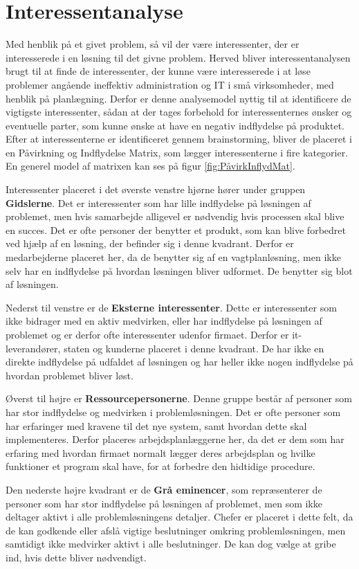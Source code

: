 \section{Interessentanalyse}
Med henblik på et givet problem, så vil der være interessenter, der er interesserede i en løsning til det givne problem. Herved bliver interessentanalysen brugt til at finde de interessenter, der kunne være interesserede i at løse problemer angående ineffektiv administration og IT i små virksomheder, med henblik på planlægning.
Derfor er denne analysemodel nyttig til at identificere de vigtigste interessenter, sådan at der tages forbehold for interessenternes ønsker og eventuelle parter, som kunne ønske at have en negativ indflydelse på produktet. Efter at interessenterne er identificeret gennem brainstorming, bliver de placeret i en Påvirkning og Indflydelse Matrix, som lægger interessenterne i fire kategorier. En generel model af matrixen kan ses på figur \ref{fig:PåvirkInflydMat}.

Interessenter placeret i det øverste venstre hjørne hører under gruppen \textbf{Gidslerne}. Det er interessenter som har lille indflydelse på løsningen af problemet, men hvis samarbejde alligevel er nødvendig hvis processen skal blive en succes. Det er ofte personer der benytter et produkt, som kan blive forbedret ved hjælp af en løsning, der befinder sig i denne kvadrant. Derfor er medarbejderne placeret her, da de benytter sig af en vagtplanløsning, men ikke selv har en indflydelse på hvordan løsningen bliver udformet. De benytter sig blot af løsningen. 

Nederst til venstre er de \textbf{Eksterne interessenter}. Dette er interessenter som ikke bidrager med en aktiv medvirken, eller har indflydelse på løsningen af problemet og er derfor ofte interessenter udenfor firmaet. Derfor er it-leverandører, staten og kunderne placeret i denne kvadrant. De har ikke en direkte indflydelse på udfaldet af løsningen og har heller ikke nogen indflydelse på hvordan problemet bliver løst. 

Øverst til højre er \textbf{Ressourcepersonerne}. Denne gruppe består af personer som har stor indflydelse og medvirken i problemløsningen. Det er ofte personer som har erfaringer med kravene til det nye system, samt hvordan dette skal implementeres. Derfor placeres arbejdsplanlæggerne  her, da det er dem som har erfaring med hvordan firmaet normalt lægger deres arbejdsplan og hvilke funktioner et program skal have, for at forbedre den hidtidige procedure. 

Den nederste højre kvadrant er de \textbf{Grå eminencer}, som repræsenterer de personer som har stor indflydelse på løsningen af problemet, men som ikke deltager aktivt i alle problemløsningens detaljer. Chefer er placeret i dette felt, da de kan godkende eller afslå vigtige beslutninger omkring problemløsningen, men samtidigt ikke medvirker aktivt i alle beslutninger. De kan dog vælge at gribe ind, hvis dette bliver nødvendigt.

